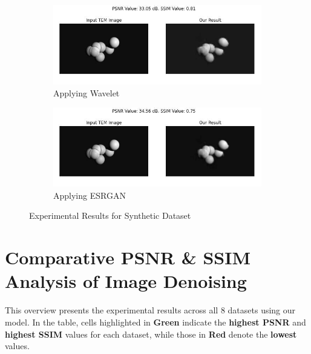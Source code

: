 \begin{figure}[H]
    \begin{subfigure}{.47\textwidth} %
        \includegraphics[width=\textwidth]{img/Results/Synthetic data/Blender_Data_4_wavelet.jpg}
        \caption{Applying Wavelet}
        \label{fig:Synthetic_Dataset_Results_Image5}
    \end{subfigure}
    \hfill
    \begin{subfigure}{.47\textwidth} %
        \includegraphics[width=\textwidth]{img/Results/Synthetic data/Blender_Data_4_ESRGAN.jpg}
        \caption{Applying ESRGAN}
        \label{fig:Synthetic_Dataset_Results_Image5}
    \end{subfigure}
    \caption{Experimental Results for Synthetic Dataset}
    \label{fig:Synthetic_Dataset_Results}
\end{figure}

\clearpage
\section{Comparative PSNR \& SSIM Analysis of Image Denoising}

This overview presents the experimental results across all 8 datasets using our model. In the table, cells highlighted in \textbf{Green} indicate the \textbf{highest PSNR} and \textbf{highest SSIM} values for each dataset, while those in \textbf{Red} denote the \textbf{lowest} values.

